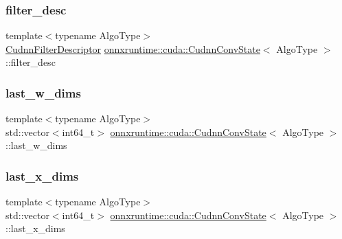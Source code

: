 \subsubsection{\texorpdfstring{filter\+\_\+desc}{filter\_desc}}
{\footnotesize\ttfamily template$<$typename Algo\+Type$>$ \\
\mbox{\hyperlink{classonnxruntime_1_1cuda_1_1CudnnFilterDescriptor}{Cudnn\+Filter\+Descriptor}} \mbox{\hyperlink{structonnxruntime_1_1cuda_1_1CudnnConvState}{onnxruntime\+::cuda\+::\+Cudnn\+Conv\+State}}$<$ Algo\+Type $>$\+::filter\+\_\+desc}

\mbox{\label{structonnxruntime_1_1cuda_1_1CudnnConvState_a2e5dca00d0c047f65dda3604d38fa74c}} 
\subsubsection{\texorpdfstring{last\+\_\+w\+\_\+dims}{last\_w\_dims}}
{\footnotesize\ttfamily template$<$typename Algo\+Type$>$ \\
std\+::vector$<$int64\+\_\+t$>$ \mbox{\hyperlink{structonnxruntime_1_1cuda_1_1CudnnConvState}{onnxruntime\+::cuda\+::\+Cudnn\+Conv\+State}}$<$ Algo\+Type $>$\+::last\+\_\+w\+\_\+dims}

\mbox{\label{structonnxruntime_1_1cuda_1_1CudnnConvState_abb6f987de8392aa5e92cda4d01cc3d46}} 
\subsubsection{\texorpdfstring{last\+\_\+x\+\_\+dims}{last\_x\_dims}}
{\footnotesize\ttfamily template$<$typename Algo\+Type$>$ \\
std\+::vector$<$int64\+\_\+t$>$ \mbox{\hyperlink{structonnxruntime_1_1cuda_1_1CudnnConvState}{onnxruntime\+::cuda\+::\+Cudnn\+Conv\+State}}$<$ Algo\+Type $>$\+::last\+\_\+x\+\_\+dims}

